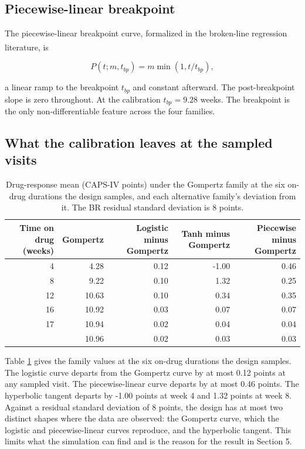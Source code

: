 \documentclass[
  11pt,
]{article}
\begin{document}
\subsection{Piecewise-linear breakpoint}\label{piecewise-linear-breakpoint}

The piecewise-linear breakpoint curve, formalized in the broken-line
regression literature\textsuperscript{}, is

\begin{equation}
P(t; m, t_{bp}) = m\min(1, t/t_{bp}),
\label{eq:plb}
\end{equation}

a linear ramp to the breakpoint \(t_{bp}\) and constant afterward. The
post-breakpoint slope is zero throughout. At the calibration
\(t_{bp} = 9.28\)
weeks. The breakpoint is the only non-differentiable feature across
the four families.

\subsection{What the calibration leaves at the sampled visits}\label{what-the-calibration-leaves-at-the-sampled-visits}

\begin{table}

\caption{\label{tab:tab-visits}Drug-response mean (CAPS-IV points) under the Gompertz family at the six on-drug durations the design samples, and each alternative family's deviation from it. The BR residual standard deviation is 8 points.}
\centering
\begin{tabular}[t]{rrrrr}
\toprule
Time on drug (weeks) & Gompertz & Logistic minus Gompertz & Tanh minus Gompertz & Piecewise minus Gompertz\\
\midrule
4 & 4.28 & 0.12 & -1.00 & 0.46\\
8 & 9.22 & 0.10 & 1.32 & 0.25\\
12 & 10.63 & 0.10 & 0.34 & 0.35\\
16 & 10.92 & 0.03 & 0.07 & 0.07\\
17 & 10.94 & 0.02 & 0.04 & 0.04\\
\addlinespace
18 & 10.96 & 0.02 & 0.03 & 0.03\\
\bottomrule
\end{tabular}
\end{table}

Table \ref{tab:tab-visits} gives the family values at the six
on-drug durations the design samples. The logistic curve departs from
the Gompertz curve by at most
0.12 points at any
sampled visit. The piecewise-linear curve departs by at most
0.46
points. The hyperbolic tangent departs by
-1.00 points at week 4
and 1.32 points at
week 8. Against a residual standard deviation of 8 points, the
design has at most two distinct shapes where the data are observed:
the Gompertz curve, which the logistic and piecewise-linear curves
reproduce, and the hyperbolic tangent. This limits what the simulation
can find and is the reason for the result in Section 5.
\end{document}
